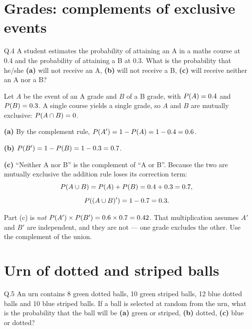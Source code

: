 \section{Grades: complements of exclusive events}

\begin{question}{Q.4}
A student estimates the probability of attaining an A in a maths course at 0.4
and the probability of attaining a B at 0.3. What is the probability that
he/she \textbf{(a)} will not receive an A, \textbf{(b)} will not receive a B,
\textbf{(c)} will receive neither an A nor a B?
\end{question}

\begin{solution}
Let $A$ be the event of an A grade and $B$ of a B grade, with $P\!\left(A\right)=0.4$
and $P\!\left(B\right)=0.3$. A single course yields a single grade, so $A$ and $B$ are
mutually exclusive: $P\!\left(A\cap B\right)=0$.

\medskip
\textbf{(a)} By the complement rule,
$P\!\left(A'\right)=1-P\!\left(A\right)=1-0.4=0.6$.

\textbf{(b)} $P\!\left(B'\right)=1-P\!\left(B\right)=1-0.3=0.7$.

\textbf{(c)} ``Neither A nor B'' is the complement of ``A or B''. Because the
two are mutually exclusive the addition rule loses its correction term:
\[
P\!\left(A\cup B\right)=P\!\left(A\right)+P\!\left(B\right)=0.4+0.3=0.7,
\]
\[
P\!\left((A\cup B)'\right)=1-0.7=0.3 .
\]

\end{solution}

\begin{pitfall}
Part (c) is \emph{not} $P\!\left(A'\right)\times P\!\left(B'\right)=0.6\times0.7=0.42$. That
multiplication assumes $A'$ and $B'$ are independent, and they are not --- one
grade excludes the other. Use the complement of the union.
\end{pitfall}

\section{Urn of dotted and striped balls}

\begin{question}{Q.5}
An urn contains 8 green dotted balls, 10 green striped balls, 12 blue dotted
balls and 10 blue striped balls. If a ball is selected at random from the urn,
what is the probability that the ball will be \textbf{(a)} green or striped,
\textbf{(b)} dotted, \textbf{(c)} blue or dotted?
\end{question}

